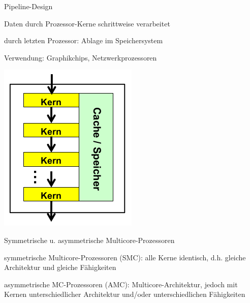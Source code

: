 \documentclass[a4paper]{article}
\begin{document}
\begin{multicols}{3}
\begin{itemize*}
\begin{itemize*}
        \end{itemize*}
        \item Pipeline-Design
        \begin{itemize*}
            \item Daten durch Prozessor-Kerne schrittweise verarbeitet
            \item durch letzten Prozessor: Ablage im Speichersystem
            \item Verwendung: Graphikchips, Netzwerkprozessoren
            \item \includegraphics[width=.3\linewidth]{Assets/AdvancedOperatingSystems-multicore-prozessoren-3.png}
        \end{itemize*}
    \end{itemize*}

    Symmetrische u. asymmetrische Multicore-Prozessoren

    \begin{itemize*}
        \item symmetrische Multicore-Prozessoren (SMC): alle Kerne identisch, d.h. gleiche Architektur und gleiche Fähigkeiten
        \item asymmetrische MC-Prozessoren (AMC): Multicore-Architektur, jedoch mit Kernen unterschiedlicher Architektur
        und/oder unterschiedlichen Fähigkeiten
    \end{itemize*}


\end{multicols}
\end{document}
